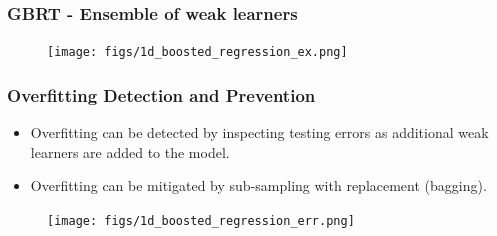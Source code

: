 \documentclass[t, pdftex]{beamer}
\begin{document}
\begin{frame}
\frametitle{GBRT - Ensemble of weak learners}

\begin{figure}[!htbp]
\centering
\texttt{[image: figs/1d\_boosted\_regression\_ex.png]}
\label{model_overview}
\end{figure}
\end{frame}

\begin{frame}
\frametitle{Overfitting Detection and Prevention}
\begin{itemize}
\item Overfitting can be detected by inspecting testing errors as additional weak learners are added to the model.
\item Overfitting can be mitigated by sub-sampling with replacement (bagging).
\end{itemize}
\begin{figure}[!htbp]
\centering
\texttt{[image: figs/1d\_boosted\_regression\_err.png]}
\label{model_overview}
\end{figure}
\end{frame}


\lastframe%
\end{document}
